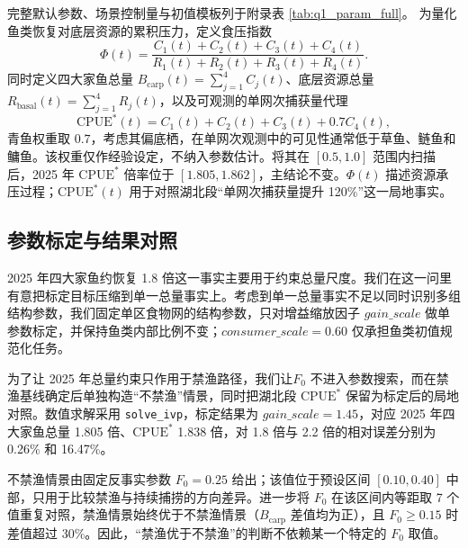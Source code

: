 \documentclass{MMCStyle}
\begin{document}
完整默认参数、场景控制量与初值模板列于附录表 \ref{tab:q1_param_full}。
为量化鱼类恢复对底层资源的累积压力，定义食压指数
\begin{equation}
\Phi(t)=\frac{C_1(t)+C_2(t)+C_3(t)+C_4(t)}{R_1(t)+R_2(t)+R_3(t)+R_4(t)}.
\end{equation}
同时定义四大家鱼总量 $B_{\text{carp}}(t)=\sum_{j=1}^4 C_j(t)$、底层资源总量 $R_{\text{basal}}(t)=\sum_{j=1}^4 R_j(t)$，以及可观测的单网次捕获量代理
\begin{equation}
\mathrm{CPUE}^*(t)=C_1(t)+C_2(t)+C_3(t)+0.7C_4(t),
\end{equation}
青鱼权重取 $0.7$，考虑其偏底栖，在单网次观测中的可见性通常低于草鱼、鲢鱼和鳙鱼。该权重仅作经验设定，不纳入参数估计。将其在 $[0.5,1.0]$ 范围内扫描后，2025 年 $\mathrm{CPUE}^*$ 倍率位于 $[1.805,1.862]$，主结论不变。$\Phi(t)$ 描述资源承压过程；$\mathrm{CPUE}^*(t)$ 用于对照湖北段“单网次捕获量提升 120\%”这一局地事实\cite{maunder2004,maunder2006}。

\subsection{参数标定与结果对照}
2025 年四大家鱼约恢复 1.8 倍这一事实主要用于约束总量尺度。我们在这一问里有意把标定目标压缩到单一总量事实上。考虑到单一总量事实不足以同时识别多组结构参数，我们固定单区食物网的结构参数，只对增益缩放因子 $gain\_scale$ 做单参数标定，并保持鱼类内部比例不变；$consumer\_scale=0.60$ 仅承担鱼类初值规范化任务。

为了让 2025 年总量约束只作用于禁渔路径，我们让$F_0$ 不进入参数搜索，而在禁渔基线确定后单独构造“不禁渔”情景，同时把湖北段 $\mathrm{CPUE}^*$ 保留为标定后的局地对照。数值求解采用 \texttt{solve\_ivp}，标定结果为 $gain\_scale=1.45$，对应 2025 年四大家鱼总量 1.805 倍、$\mathrm{CPUE}^*$ 1.838 倍，对 1.8 倍与 2.2 倍的相对误差分别为 0.26\% 和 16.47\%。

不禁渔情景由固定反事实参数 $F_0=0.25$ 给出；该值位于预设区间 $[0.10,0.40]$ 中部，只用于比较禁渔与持续捕捞的方向差异。进一步将 $F_0$ 在该区间内等距取 7 个值重复对照，禁渔情景始终优于不禁渔情景（$B_{\text{carp}}$ 差值均为正），且 $F_0\ge 0.15$ 时差值超过 30\%。因此，“禁渔优于不禁渔”的判断不依赖某一个特定的 $F_0$ 取值。
\end{document}

